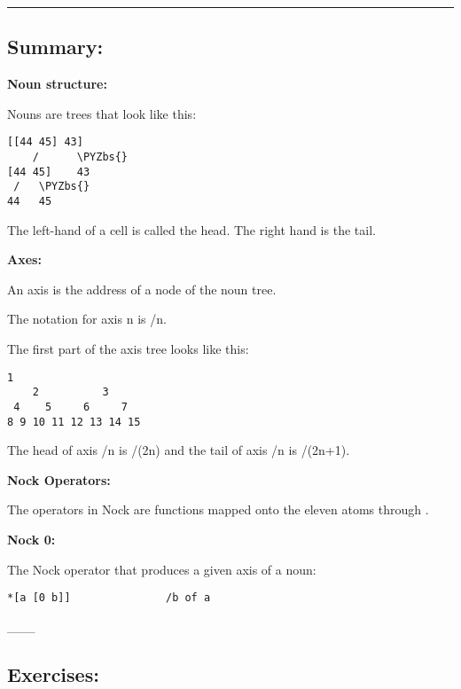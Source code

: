 \begin{center}
\rule{3in}{0.4pt}
\end{center}

\subsection{Summary:}

\textbf{Noun structure:}

Nouns are trees that look like this:
\begin{framed_shaded}
\begin{Verbatim}[fontsize=\relsize{-2.5},fontseries=b,commandchars=\\\{\}]
 [[44 45] 43]
    /      \PYZbs{}
[44 45]    43
 /   \PYZbs{}
44   45
\end{Verbatim}
\end{framed_shaded}
The left-hand of a cell is called the head. The right hand is the tail.

\textbf{Axes:}

An axis is the address of a node of the noun tree.

The notation for axis n is /n.

The first part of the axis tree looks like this:
\begin{framed_shaded}
\begin{Verbatim}[fontsize=\relsize{-2.5},fontseries=b,commandchars=\\\{\}]
         1
    2          3
 4    5     6     7
8 9 10 11 12 13 14 15
\end{Verbatim}
\end{framed_shaded}
The head of axis /n is /(2n) and the tail of axis /n is /(2n+1). 

\textbf{Nock Operators:}

The operators in Nock are functions mapped onto the eleven atoms  through . 

\textbf{Nock 0:}

The Nock operator that produces a given axis of a noun:
\begin{framed_shaded}
\begin{Verbatim}[fontsize=\relsize{-2.5},fontseries=b,commandchars=\\\{\}]
*[a [0 b]]               /b of a
\end{Verbatim}
\end{framed_shaded}
\_\_\_

\subsection{Exercises:}


